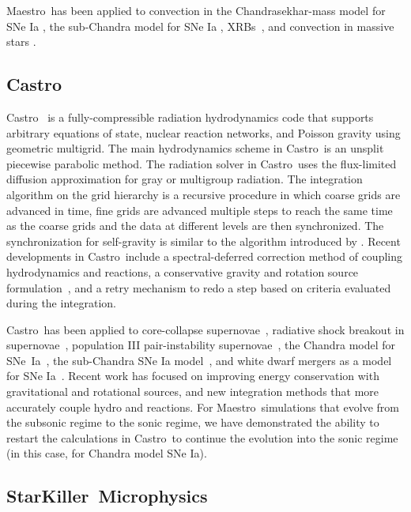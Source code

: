 \documentclass[a4paper]{jpconf}
\newcommand{\maestro}{{\sffamily Maestro}}
\newcommand{\castro}{{\sffamily Castro}}
\newcommand{\starkiller}{{\sffamily StarKiller}}
\begin{document}
\maestro\ has been applied to convection in the Chandrasekhar-mass
model for SNe Ia \cite{ZABNW:IV,wdconvect,wdturb}, the sub-Chandra
model for SNe Ia \cite{subchandra,subchandra2},
XRBs~\cite{xrb,xrb2,xrb3}, and convection in massive stars
\cite{ms_cc}.



\subsection{\castro}

\castro~\cite{castro,castroII,castroIII} is a fully-compressible
radiation hydrodynamics code that supports arbitrary equations of
state, nuclear reaction networks, and Poisson gravity using geometric
multigrid.  The main hydrodynamics scheme in \castro\ is an unsplit
piecewise parabolic method.  The radiation solver in \castro\ uses the
flux-limited diffusion approximation for gray or multigroup radiation.
The integration algorithm on the grid hierarchy is a recursive
procedure in which coarse grids are advanced in time, fine grids are
advanced multiple steps to reach the same time as the coarse grids and
the data at different levels are then synchronized. The
synchronization for self-gravity is similar to the algorithm
introduced by \cite{miniati-colella}.  Recent developments in
\castro\ include a spectral-deferred correction method of coupling
hydrodynamics and reactions, a conservative gravity and rotation
source formulation~\cite{wdmergerI}, and a retry mechanism to redo a
step based on criteria evaluated during the
integration.

\castro\ has been applied to core-collapse
supernovae~\cite{castro-ccsne}, radiative shock breakout in
supernovae~\cite{lovegrove:2017}, population III pair-instability
supernovae~\cite{castro-pairinstability}, the Chandra model for
SNe~Ia~\cite{ma:2013}, the sub-Chandra SNe Ia model~\cite{moll:2013}, and white dwarf mergers as a model for SNe
Ia~\cite{moll:2014,wdmergerI}. Recent work has focused on improving energy
conservation with gravitational and rotational sources, and new
integration methods that more accurately couple hydro and reactions.
For \maestro\ simulations that evolve from the subsonic regime to the
sonic regime, we have demonstrated the ability to restart the
calculations in \castro\ to continue the evolution into the sonic
regime~\cite{scidac-petascale,malone:2014} (in this case, for Chandra
model SNe Ia).

\subsection{\starkiller\ Microphysics}
\end{document}
